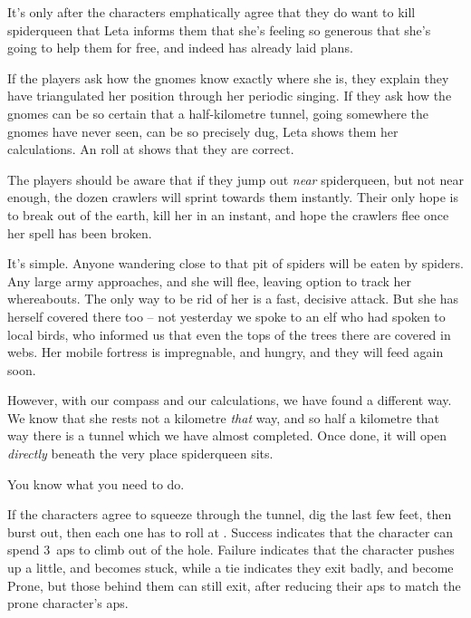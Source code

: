 It's only after the characters emphatically agree that they do want to kill \gls{spiderqueen} that Leta informs them that she's feeling so generous that she's going to help them for free, and indeed has already laid plans.

If the players ask how the gnomes know exactly where she is, they explain they have triangulated her position through her periodic singing.
If they ask how the gnomes can be so certain that a half-kilometre tunnel, going somewhere the gnomes have never seen, can be so precisely dug, Leta shows them her calculations.
An  roll at \tn[11] shows that they are correct.

The players should be aware that if they jump out \emph{near} \gls{spiderqueen}, but not near enough, the dozen \glspl{crawler} will sprint towards them instantly.
Their only hope is to break out of the earth, kill her in an instant, and hope the \glspl{crawler} flee once her spell has been broken.

\begin{speechtext}
  It's simple.
  Anyone wandering close to that pit of spiders will be eaten by spiders.
  Any large army approaches, and she will flee, leaving option to track her whereabouts.
  The only way to be rid of her is a fast, decisive attack.
  But she has herself covered there too -- not yesterday we spoke to an elf who had spoken to local birds, who informed us that even the tops of the trees there are covered in webs.
  Her mobile fortress is impregnable, and hungry, and they will feed again soon.

  However, with our compass and our calculations, we have found a different way.
  We know that she rests not a kilometre \emph{that} way, and so half a kilometre that way there is a tunnel which we have almost completed.
  Once done, it will open \emph{directly} beneath the very place \gls{spiderqueen} sits.

  You know what you need to do.
\end{speechtext}

If the characters agree to squeeze through the tunnel, dig the last few feet, then burst out, then each one has to roll  at \tn[7].
Success indicates that the character can spend 3~\glspl{ap} to climb out of the hole.
Failure indicates that the character pushes up a little, and becomes stuck,%
while a tie indicates they exit badly, and become Prone, but those behind them can still exit, after reducing their \glspl{ap} to match the prone character's \glspl{ap}.


